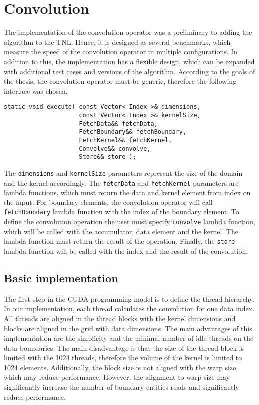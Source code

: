 
\chapter{Convolution} \label{sec:convolution}

The implementation of the convolution operator was a preliminary to adding the algorithm to the TNL.
Hence, it is designed as several benchmarks, which measure the speed of the convolution operator in multiple configurations.
In addition to this, the implementation has a flexible design, which can be expanded with additional test cases and versions of the algorithm.
According to the goals of the thesis, the convolution operator must be generic, therefore the following interface was chosen.

\begin{listing}[!h]
\begin{verbatim}
static void execute( const Vector< Index >& dimensions,
                     const Vector< Index >& kernelSize,
                     FetchData&& fetchData,
                     FetchBoundary&& fetchBoundary,
                     FetchKernel&& fetchKernel,
                     Convolve&& convolve,
                     Store&& store );
\end{verbatim}
\end{listing}

The \texttt{dimensions} and \texttt{kernelSize} parameters represent the size of the domain and the kernel accordingly.
The \texttt{fetchData} and \texttt{fetchKernel} parameters are lambda functions, which must return the data and kernel element from index on the input.
For boundary elements, the convolution operator will call \texttt{fetchBoundary} lambda function with the index of the boundary element.
To define the convolution operation the user must specify \texttt{convolve} lambda function, which will be called with the accumulator, data element and the kernel.
The lambda function must return the result of the operation.
Finally, the \texttt{store} lambda function will be called with the index and the result of the convolution.

\section{Basic implementation}

The first step in the CUDA programming model is to define the thread hierarchy.
In our implementation, each thread calculates the convolution for one data index.
All threads are aligned in the thread blocks with the kernel dimensions and blocks are aligned in the grid with data dimensions.
The main advantages of this implementation are the simplicity and the minimal number of idle threads on the data boundaries.
The main disadvantage is that the size of the thread block is limited with the 1024 threads, therefore the volume of the kernel is limited to 1024 elements.
Additionally, the block size is not aligned with the warp size, which may reduce performance.
However, the alignment to warp size may significantly increase the number of boundary entities reads and significantly reduce performance.

